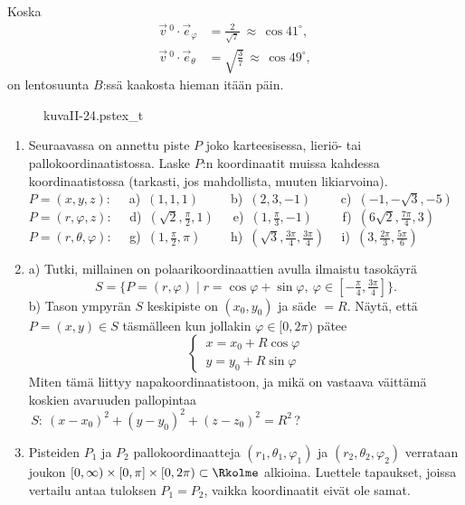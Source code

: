 Koska
\begin{align*}
\vec v\,^0 \cdot \vec e_\varphi &= \frac{2}{\sqrt{7}}\ \approx\, \cos{41^\circ}, \\
\vec v\,^0 \cdot \vec e_\theta &= \sqrt{\frac{3}{7}}\, \approx\, \cos{49^\circ},
\end{align*}
on lentosuunta $B$:ssä kaakosta hieman itään päin. \loppu
\begin{figure}[H]
\begin{center}
{kuvaII-24.pstex_t}
\end{center}
\end{figure}

\Harj
\begin{enumerate}

\item
Seuraavassa on annettu piste $P$ joko karteesisessa, lieriö- tai pallokoordinaatistossa.
Laske $P$:n koordinaatit muissa kahdessa koordinaatistossa (tarkasti, jos mahdollista,
muuten likiarvoina). \vspace{1mm}\newline 
$P=(x,y,z): \quad$ 
a)\, $(1,1,1) \qquad\,$ 
b)\, $(2,3,-1) \qquad$ 
c)\, $(-1,-\sqrt{3},-5)$ \newline
$P=(r,\varphi,z): \quad$
d)\, $(\sqrt{2},\frac{\pi}{2},1) \quad\,$ 
e)\, $(1,\frac{\pi}{3},-1) \qquad$
f)\, $(6\sqrt{2},\frac{7\pi}{4},3)$ \newline
$P=(r,\theta,\varphi): \quad $
g)\, $(1,\frac{\pi}{2},\pi) \qquad$
h)\, $(\sqrt{3},\frac{3\pi}{4},\frac{3\pi}{4}) \quad$
i)\, $(3,\frac{2\pi}{3},\frac{5\pi}{6})$

\item
a) Tutki, millainen on polaarikoordinaattien avulla ilmaistu tasokäyrä
\[
S=\{P=(r,\varphi) \mid r=\cos\varphi+\sin\varphi,\ 
                       \varphi\in[-\tfrac{\pi}{4},\tfrac{3\pi}{4}]\}.
\]
b) Tason ympyrän $S$ keskipiste on $(x_0,y_0)$ ja säde $=R$. Näytä, että
$P=(x,y) \in S$ täsmälleen kun jollakin $\varphi\in[0,2\pi)$ pätee
\[ 
\begin{cases} \,x=x_0+R\cos\varphi \\ \,y=y_0+R\sin\varphi \end{cases}
\]
Miten tämä liittyy napakoordinaatistoon, ja mikä on vastaava väittämä koskien
avaruuden pallopintaa $\,S:\ (x-x_0)^2+(y-y_0)^2+(z-z_0)^2=R^2$\,?

\item
Pisteiden $P_1$ ja $P_2$ pallokoordinaatteja $(r_1,\theta_1,\varphi_1)$ ja 
$(r_2,\theta_2,\varphi_2)$ verrataan joukon 
$[0,\infty)\times[0,\pi]\times[0,2\pi)\subset\Rkolme$ alkioina. Luettele tapaukset,
joissa vertailu antaa tuloksen $P_1=P_2$, vaikka koordinaatit eivät ole samat.


\end{enumerate}
